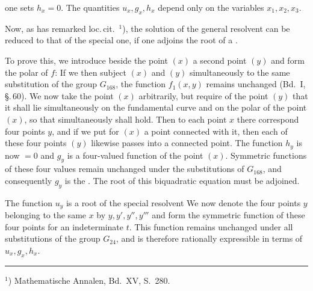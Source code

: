
one sets $h_x = 0$. The quantities $u_x, g_x, h_x$ depend only on the
variables $x_1, x_2, x_3$.

Now, as  has remarked loc.\,cit.\ ${}^1$), the solution
of the general resolvent can be reduced to that of the special one,
if one adjoins the root of a .

To prove this, we introduce beside the point $(x)$
a second point $(y)$ and form the polar of $f$:
If we then subject $(x)$ and $(y)$ simultaneously to the same substitution
of the group $G_{168}$, the function $f_1(x,y)$ remains
unchanged (Bd.\ I, \S.\,60). We now take the point $(x)$ arbitrarily,
but require of the point $(y)$ that it shall lie simultaneously
on the fundamental curve and on the polar of the point $(x)$,
so that simultaneously
shall hold. Then to each point $x$ there correspond four points $y$, and
if we put for $(x)$ a point connected with it, then
each of these four points $(y)$ likewise passes into a connected
point. The function $h_y$ is now $=0$ and $g_y$ is a four-valued
function of the point $(x)$. Symmetric functions
of these four values remain unchanged under the substitutions
of $G_{168}$, and consequently $g_y$ is the .
The root of this biquadratic equation must be
adjoined.

The function $u_y$ is a root of the special resolvent
We now denote the four points $y$ belonging to the same $x$
by $y, y', y'', y'''$ and form the symmetric function of these
four points
for an indeterminate $t$. This function remains unchanged under
all substitutions of the group $G_{24}$, and is therefore rationally
expressible in terms of $u_x, g_x, h_x$.

\par\noindent\rule{0.3\linewidth}{0.4pt}\par
${}^1$) Mathematische Annalen, Bd.\ XV, S.\ 280.
